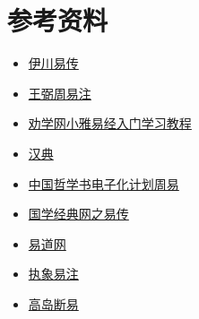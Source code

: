 \documentclass[12pt,oneside]{book}
\begin{document}
\chapter{参考资料}
\begin{itemize}
\item \href{https://www.eee-learning.com/article/897}{伊川易传}
\item \href{http://www.quanxue.cn/QT_MingXiang/ZhouYiZhuIndex.html}{王弼周易注}
\item \href{http://www.quanxue.cn/QT_XiaoYa/YiJingIndex.html}{劝学网小雅易经入门学习教程}
\item \href{https://www.zdic.net/}{汉典}
\item \href{https://ctext.org/book-of-changes/zhs}{中国哲学书电子化计划周易}
\item \href{http://vsucai.cn/yizhuan/index.html}{国学经典网之易传}
\item \href{http://baike.yidao5.com/}{易道网}
\item \href{http://www.xshiqi.com/category_zyzs/dgzs/zxyz/}{执象易注}
\item \href{http://www.xshiqi.com/category_zyzs/dgzs/gddy}{高岛断易}

\end{itemize}








\end{document}
